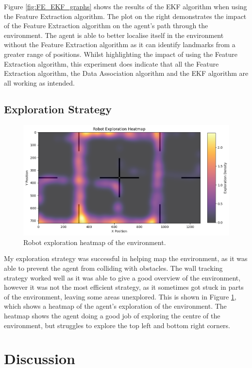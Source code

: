 \documentclass[12pt]{article}
\begin{document}
Figure \ref{fig:FE_EKF_graphs} shows the results of the EKF algorithm when using the Feature Extraction algorithm. The plot on the right demonstrates
the impact of the Feature Extraction algorithm on the agent's path through the environment. The agent is able to better localise itself in the environment
without the Feature Extraction algorithm as it can identify landmarks from a greater range of positions. Whilst highlighting the impact of using the Feature
Extraction algorithm, this experiment does indicate that all the Feature Extraction algorithm, the Data Association algorithm and the EKF algorithm are all
working as intended.\\

\subsection{Exploration Strategy}
\begin{figure}[h]
    \centering
    \includegraphics[width=0.7\linewidth]{heatmap}
    \caption[Short caption]{Robot exploration heatmap of the environment.}
    \label{fig:heatmap}
\end{figure}
My exploration strategy was successful in helping map the environment, as it was able to prevent the agent from colliding with
obstacles. The wall tracking strategy worked well as it was able to give a good overview of the environment, however it was
not the most efficient strategy, as it sometimes got stuck in parts of the environment, leaving some areas unexplored. This is
shown in Figure \ref{fig:heatmap}, which shows a heatmap of the agent's exploration of the environment. The heatmap shows the
agent doing a good job of exploring the centre of the environment, but struggles to explore the top left and bottom right corners.\\

\section{Discussion}
\end{document}
